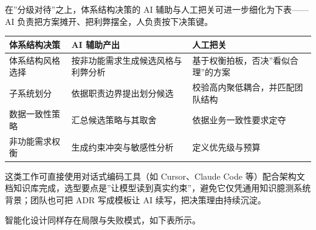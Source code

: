 \documentclass[12pt,a4paper,twoside,openany]{ctexbook}
\numberwithin{figure}{chapter}
\numberwithin{table}{chapter}
\newcounter{none}
\begin{document}
在''分级对待''之上，体系结构决策的 AI
辅助与人工把关可进一步细化为下表------AI
负责把方案摊开、把利弊摆全，人负责按下决策键。

{\def\LTcaptype{none} %
\begin{longtable}[]{@{}
  >{\raggedright\arraybackslash}p{}
  >{\raggedright\arraybackslash}p{}
  >{\raggedright\arraybackslash}p{}@{}}
\toprule\noalign{}
\begin{minipage}[b]{\linewidth}\raggedright
体系结构决策
\end{minipage} & \begin{minipage}[b]{\linewidth}\raggedright
AI 辅助产出
\end{minipage} & \begin{minipage}[b]{\linewidth}\raggedright
人工把关
\end{minipage} \\
\midrule\noalign{}
\endhead
\bottomrule\noalign{}
\endlastfoot
体系结构风格选择 & 按非功能需求生成候选风格与利弊分析 &
基于权衡拍板，否决''看似合理''的方案 \\
子系统划分 & 依据职责边界提出划分候选 &
校验高内聚低耦合，并匹配团队结构 \\
数据一致性策略 & 汇总候选策略与其取舍 & 依据业务一致性要求定夺 \\
非功能需求权衡 & 生成约束冲突与敏感性分析 & 定义优先级与预算 \\
\end{longtable}
}

这类工作可直接使用对话式编码工具（如 Cursor、Claude Code
等）配合架构文档知识库完成，选型要点是''让模型读到真实约束''，避免它仅凭通用知识臆测系统背景；团队也可把
ADR 写成模板让 AI 续写，把决策理由持续沉淀。

智能化设计同样存在局限与失败模式，如下表所示。
\end{document}
